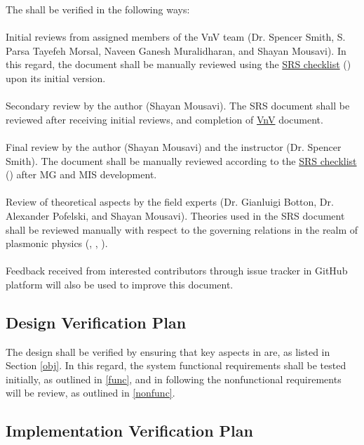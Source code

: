 \documentclass[12pt, titlepage]{article}
\begin{document}
The \progname{} shall be verified in the following ways:\\
\\
 Initial reviews from assigned members of the VnV team (Dr. Spencer Smith, S. Parsa Tayefeh Morsal, Naveen Ganesh Muralidharan, and Shayan Mousavi). In this regard, the document shall be manually reviewed using the \href{https://gitlab.cas.mcmaster.ca/smiths/cas741/-/blob/master/BlankProjectTemplate/docs/SRS/SRS-Checklist.pdf}{SRS checklist} (\cite{BlankPro77:online}) upon its initial version.\\
 \\
 Secondary review by the author (Shayan Mousavi). The SRS document shall be reviewed after receiving initial reviews, and completion of \href{https://github.com/shmouses/SPDFM/tree/master/docs/VnV}{VnV} document.\\  
 \\
 Final review by the author (Shayan Mousavi) and the instructor (Dr. Spencer Smith). The document shall be manually reviewed according to the  \href{https://gitlab.cas.mcmaster.ca/smiths/cas741/-/blob/master/BlankProjectTemplate/docs/SRS/SRS-Checklist.pdf}{SRS checklist} (\cite{BlankPro77:online})  after MG and MIS development.\\ 
 \\
 Review of theoretical aspects by the field experts (Dr. Gianluigi Botton, Dr. Alexander Pofelski, and Shayan Mousavi). Theories used in the SRS document shall be reviewed manually with respect to the governing relations in the realm of plasmonic physics (\cite{maier2007plasmonics}, \cite{hiremath2012numerical}, \cite{monk2003finite}).\\
 \\ 
 Feedback received from interested contributors through issue tracker in GitHub platform will also be used to improve this document. 
 

\subsection{Design Verification Plan}

The design shall be verified by ensuring that key aspects in \progname{} are, as listed in Section \ref{obj}. In this regard, the system functional requirements shall be tested initially, as outlined in \ref{func}, and in following the nonfunctional requirements will be review, as outlined in \ref{nonfunc}.

\subsection{Implementation Verification Plan}
\end{document}
